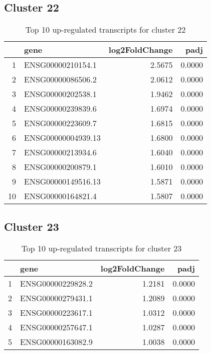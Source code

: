 \documentclass{article}
\begin{document}
\subsection{Cluster 22 }
\begin{table}[H]
\centering
\begin{tabular}{rlrr}
  \hline
 & gene & log2FoldChange & padj \\ 
  \hline
1 & ENSG00000210154.1 & 2.5675 & 0.0000 \\ 
  2 & ENSG00000086506.2 & 2.0612 & 0.0000 \\ 
  3 & ENSG00000202538.1 & 1.9462 & 0.0000 \\ 
  4 & ENSG00000239839.6 & 1.6974 & 0.0000 \\ 
  5 & ENSG00000223609.7 & 1.6815 & 0.0000 \\ 
  6 & ENSG00000004939.13 & 1.6800 & 0.0000 \\ 
  7 & ENSG00000213934.6 & 1.6040 & 0.0000 \\ 
  8 & ENSG00000200879.1 & 1.6010 & 0.0000 \\ 
  9 & ENSG00000149516.13 & 1.5871 & 0.0000 \\ 
  10 & ENSG00000164821.4 & 1.5807 & 0.0000 \\ 
   \hline
\end{tabular}
\caption{Top 10 up-regulated transcripts for cluster 22} 
\label{tab:q3_1_22}
\end{table}
\subsection{Cluster 23 }
\begin{table}[H]
\centering
\begin{tabular}{rlrr}
  \hline
 & gene & log2FoldChange & padj \\ 
  \hline
1 & ENSG00000229828.2 & 1.2181 & 0.0000 \\ 
  2 & ENSG00000279431.1 & 1.2089 & 0.0000 \\ 
  3 & ENSG00000223617.1 & 1.0312 & 0.0000 \\ 
  4 & ENSG00000257647.1 & 1.0287 & 0.0000 \\ 
  5 & ENSG00000163082.9 & 1.0038 & 0.0000 \\ 
   \hline
\end{tabular}
\caption{Top 10 up-regulated transcripts for cluster 23} 
\label{tab:q3_1_23}
\end{table}
\end{document}
